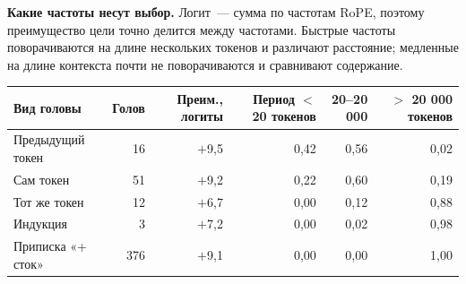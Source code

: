 \documentclass[10pt]{article}
\begin{document}
\noindent\begin{minipage}{\linewidth}
\textbf{Какие частоты несут выбор.} Логит~— сумма по частотам RoPE, поэтому преимущество цели точно делится между частотами. Быстрые частоты поворачиваются на длине нескольких токенов и различают расстояние; медленные на длине контекста почти не поворачиваются и сравнивают содержание.
\begin{center}{\small\begin{tabular}{|l|r|r|r|r|r|}\hline
\rowcolor{head}\textbf{Вид головы} & \textbf{Голов} & \textbf{Преим., логиты} & \textbf{Период $<$ 20 токенов} & \textbf{20–20 000} & \textbf{$>$ 20 000 токенов} \\ \hline
Предыдущий токен & 16 & $+$9,5 & 0,42 & 0,56 & 0,02 \\ \hline
Сам токен & 51 & $+$9,2 & 0,22 & 0,60 & 0,19 \\ \hline
Тот же токен & 12 & $+$6,7 & 0,00 & 0,12 & 0,88 \\ \hline
Индукция & 3 & $+$7,2 & 0,00 & 0,02 & 0,98 \\ \hline
Приписка «+ сток» & 376 & $+$9,1 & 0,00 & 0,00 & 1,00 \\ \hline
\hline\end{tabular}}\end{center}
\end{minipage}
\par
\end{document}

